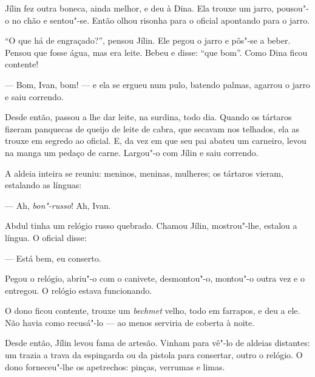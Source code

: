 Jílin fez outra boneca, ainda melhor, e deu à Dina. Ela trouxe um jarro,
pousou"-o no chão e sentou"-se. Então olhou risonha para o oficial
apontando para o jarro.

``O que há de engraçado?'', pensou Jílin. Ele pegou o jarro e pôs"-se a
beber. Pensou que fosse água, mas era leite. Bebeu e disse: ``que bom''.
Como Dina ficou contente!

--- Bom, Ivan, bom! --- e ela se ergueu num pulo, batendo palmas,
agarrou o jarro e saiu correndo.

Desde então, passou a lhe dar leite, na surdina, todo dia. Quando os
tártaros fizeram panquecas de queijo de leite de cabra, que secavam nos
telhados, ela as trouxe em segredo ao oficial. E, da vez em que seu pai
abateu um carneiro, levou na manga um pedaço de carne.
Largou"-o com Jílin e saiu correndo.



A aldeia inteira se reuniu: meninos, meninas, mulheres; os tártaros
vieram, estalando as línguas:

--- Ah, \emph{bon"-russo}! Ah, Ivan.

Abdul tinha um relógio russo quebrado. Chamou Jílin, mostrou"-lhe,
estalou a língua. O oficial disse:

--- Está bem, eu conserto.

Pegou o relógio, abriu"-o com o canivete, desmontou"-o, montou"-o outra vez
e o entregou. O relógio estava funcionando.

O dono ficou contente, trouxe um \emph{bechmet} velho, todo em farrapos,
e deu a ele. Não havia como recusá"-lo --- ao menos serviria de coberta à
noite.

Desde então, Jílin levou fama de artesão. Vinham para vê"-lo de aldeias
distantes: um trazia a trava da espingarda ou da pistola para consertar,
outro o relógio. O dono forneceu"-lhe os apetrechos: pinças, verrumas e
limas.

